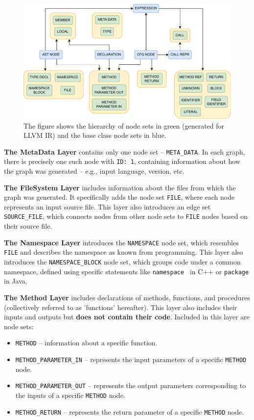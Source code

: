 \begin{figure}[t]
	\centering
	\includegraphics[width=1\textwidth]{figures/node-set-hierarchy.pdf}
	\caption{The figure shows the hierarchy of node sets in green (generated for LLVM IR) and the base class node sets in blue.}
	\label{figure:node-set-hierarchy}
\end{figure}

\textbf{The MetaData Layer} contains only one node set -- \texttt{META\_DATA}. In each graph, there is precisely one such node with \texttt{ID: 1}, containing information about how the graph was generated -- e.g., input language, version, etc.

\textbf{The FileSystem Layer} includes information about the files from which the graph was generated. It specifically adds the node set \texttt{FILE}, where each node represents an input source file. This layer also introduces an edge set \texttt{SOURCE\_FILE}, which connects nodes from other node sets to \texttt{FILE} nodes based on their source file.

\textbf{The Namespace Layer} introduces the \texttt{NAMESPACE} node set, which resembles \texttt{FILE} and describes the namespace as known from programming. This layer also introduces the \texttt{NAMESPACE\_BLOCK} node set, which groups code under a common namespace, defined using specific statements like \texttt{namespace{ }} in C++ or \texttt{package} in Java.

\textbf{The Method Layer} includes declarations of methods, functions, and procedures (collectively referred to as 'functions' hereafter). This layer also includes their inputs and outputs but \textbf{does not contain their code}. Included in this layer are node sets:
\begin{itemize}
    \item \texttt{METHOD} -- information about a specific function.
    \item \texttt{METHOD\_PARAMETER\_IN} -- represents the input parameters of a specific \texttt{METHOD} node.
    \item \texttt{METHOD\_PARAMETER\_OUT} -- represents the output parameters corresponding to the inputs of a specific \texttt{METHOD} node.
    \item \texttt{METHOD\_RETURN} -- represents the return parameter of a specific \texttt{METHOD} node.
\end{itemize}

